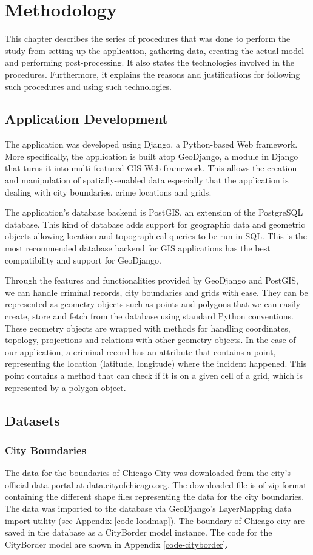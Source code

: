 \chapter{Methodology}
    This chapter describes the series of procedures that was done to perform the study \textemdash from setting up the application, gathering data, creating the actual model and performing post-processing. It also states the technologies involved in the procedures. Furthermore, it explains the reasons and justifications for following such procedures and using such technologies.
\section{Application Development}
    The application was developed using Django, a Python-based Web framework. More specifically, the application is built atop GeoDjango, a module in Django that turns it into multi-featured GIS Web framework. This allows the creation and manipulation of spatially-enabled data especially that the application is dealing with city boundaries, crime locations and grids.

    The application's database backend is PostGIS, an extension of the PostgreSQL database. This kind of database adds support for geographic data and geometric objects allowing location and topographical queries to be run in SQL. This is the most recommended database backend for GIS applications has the best compatibility and support for GeoDjango.

    Through the features and functionalities provided by GeoDjango and PostGIS, we can handle criminal records, city boundaries and grids with ease. They can be represented as geometry objects such as points and polygons that we can easily create, store and fetch from the database using standard Python conventions. These geometry objects are wrapped with methods for handling coordinates, topology, projections and relations with other geometry objects. In the case of our application, a criminal record has an attribute that contains a point, representing the location (latitude, longitude) where the incident happened. This point contains a method that can check if it is on a given cell of a grid, which is represented by a polygon object.

\section{Datasets}
    \subsection{City Boundaries}
        The data for the boundaries of Chicago City was downloaded from the city's official data portal at data.cityofchicago.org. The downloaded file is of zip format containing the different shape files representing the data for the city boundaries. The data was imported to the database via GeoDjango's LayerMapping data import utility (see Appendix \ref{code-loadmap}). The boundary of Chicago city are saved in the database as a CityBorder model instance. The code for the CityBorder model are shown in Appendix \ref{code-cityborder}. 
